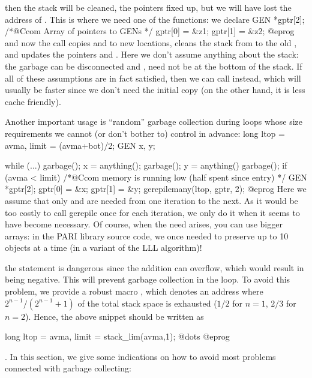 \noindent
then the stack will be cleaned, the pointers fixed up, but we will have lost
the address of . This is where we need one of the 
functions: we declare
\bprog
  GEN *gptr[2]; /*@Ccom Array of pointers to GENs */
  gptr[0] = &z1; gptr[1] = &z2;
@eprog
\noindent and now the call  copies 
and  to new locations, cleans the stack from  to the old
, and updates the pointers  and . Here we don't
assume anything about the stack: the garbage can be disconnected and
,  need not be at the bottom of the stack. If all of these
assumptions are in fact satisfied, then we can call 
instead, which will usually be faster since we don't need the initial copy
(on the other hand, it is less cache friendly).

Another important usage is ``random'' garbage collection during loops
whose size requirements we cannot (or don't bother to) control in advance:
\bprog
  long ltop = avma, limit = (avma+bot)/2;
  GEN x, y;

  while (...)
  {
    garbage(); x = anything();
    garbage(); y = anything()
    garbage();
    if (avma < limit) /*@Ccom memory is running low (half spent since entry) */
    {
       GEN *gptr[2];
       gptr[0] = &x; gptr[1] = &y;
       gerepilemany(ltop, gptr, 2);
    } 
  } 
@eprog
\noindent Here we assume that only  and  are needed from one
iteration to the next. As it would be too costly to call gerepile once for
each iteration, we only do it when it seems to have become necessary. Of
course, when the need arises, you can use bigger  arrays: in the
PARI library source code, we once needed to preserve up to 10 objects at a
time (in a variant of the LLL algorithm)!

 the statement  is
dangerous since the addition can overflow, which would result in
 being negative. This will prevent garbage collection in the
loop. To avoid this problem, we provide a robust macro
, which denotes an address where $2^{n-1} /
(2^{n-1}+1)$ of the total stack space is exhausted ($1/2$ for $n=1$, $2/3$
for $n=2$). Hence, the above snippet should be written as

\bprog
  long ltop = avma, limit = stack_lim(avma,1);
  @dots
@eprog

. In this section, we give some indications
on how to avoid most problems connected with garbage collecting:

